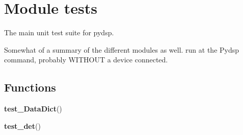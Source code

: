 %
%
%


\section{Module tests}

    \label{tests}
The main unit test suite for pydsp.

Somewhat of a summary of the different modules as well. run at the Pydsp 
command, probably WITHOUT a device connected.



  \subsection{Functions}

    \label{tests:test_DataDict}

    \vspace{0.5ex}

    \begin{boxedminipage}{\textwidth}

    \raggedright \textbf{test\_DataDict}()

    \end{boxedminipage}

    \label{tests:test_det}

    \vspace{0.5ex}

    \begin{boxedminipage}{\textwidth}

    \raggedright \textbf{test\_det}()

    \end{boxedminipage}

    \label{tests:test_run}

